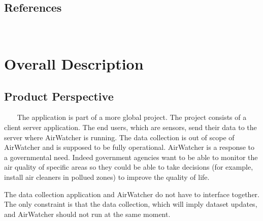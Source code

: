 \documentclass{report}
\begin{document}
\section{References} ~~~

\chapter{Overall Description}

\section{Product Perspective} ~~~
The application is part of a more global project. The project consists of a
client server application. The end users, which are sensors, send their data to
the server where AirWatcher is running. The data collection is out of scope of
AirWatcher and is supposed to be fully operational. AirWatcher is a response to
a governmental need. Indeed government agencies want to be able to monitor the air
quality of specific areas so they could be able to take decisions (for example,
install air cleaners in pollued zones) to improve the quality of life.

The data collection application and AirWatcher do not have to interface together.
The only constraint is that the data collection, which will imply dataset
updates, and AirWatcher should not run at the same moment.

\end{document}
